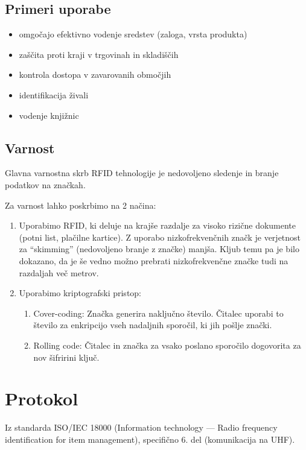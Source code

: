 \documentclass[]{article}
\begin{document}
\subsection{Primeri uporabe}
\begin{itemize}
  \item omgo\v{c}ajo efektivno vodenje sredstev (zaloga, vrsta
    produkta)
  \item za\v{s}\v{c}ita proti kraji v trgovinah in skladi\v{s}\v{c}ih
  \item kontrola dostopa v zavarovanih obmo\v{c}jih
  \item identifikacija \v{z}ivali
  \item vodenje knji\v{z}nic
\end{itemize}

\clearpage
\subsection{Varnost}
Glavna varnostna skrb RFID tehnologije je nedovoljeno sledenje in
branje podatkov na zna\v{c}kah.

\noindent
Za varnost lahko poskrbimo na 2 na\v{c}ina:
\begin{enumerate}
  \item Uporabimo RFID, ki deluje na kraj\v{s}e razdalje za visoko
    rizi\v{c}ne dokumente (potni list, pla\v{c}ilne kartice). Z
    uporabo nizkofrekven\v{c}nih zna\v{c}k je verjetnost za
    ``skimming'' (nedovoljeno branje z zna\v{c}ke) manj\v{s}a. Kljub
    temu pa je bilo dokazano, da je \v{s}e vedno mo\v{z}no prebrati
    nizkofrekven\v{c}ne zna\v{c}ke tudi na razdaljah ve\v{c} metrov.
  \item Uporabimo kriptografski pristop:
    \begin{enumerate}[label=\alph*.]
        \item Cover-coding: Zna\v{c}ka generira naklju\v{c}no
          \v{s}tevilo. \v{C}italec uporabi to \v{s}tevilo za
          enkripcijo vseh nadaljnih sporo\v{c}il, ki jih po\v{s}lje
          zna\v{c}ki.
        \item Rolling code: \v{C}italec in zna\v{c}ka za vsako
          poslano sporo\v{c}ilo dogovorita za nov \v{s}ifririni
          klju\v{c}.
    \end{enumerate}
\end{enumerate}

\section{Protokol}
Iz standarda ISO/IEC 18000 (Information technology — Radio
frequency identification for item management), specifi\v{c}no 6.
del (komunikacija na UHF).
\end{document}
